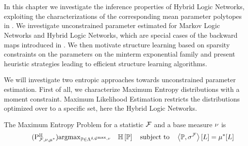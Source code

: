 \chapter{\chatextnetworkReasoning}\label{cha:networkReasoning}

In this chapter we investigate the inference properties of Hybrid Logic Networks, exploiting the characterizations of the corresponding mean parameter polytopes in .
We investigate unconstrained parameter estimated for Markov Logic Networks and Hybrid Logic Networks, which are special cases of the backward maps introduced in .
We then motivate structure learning based on sparsity constraints on the parameters on the minterm exponential family and present heuristic strategies leading to efficient structure learning algorithms.



 \label{sec:parameterEstimation} %

We will investigate two entropic approaches towards unconstrained parameter estimation.
First of all, we characterize Maximum Entropy distributions with a moment constraint.
Maximum Likelihood Estimation restricts the distributions optimized over to a specific set, here the Hybrid Logic Networks.


The Maximum Entropy Problem for a statistic $\mathcal{F}$ and a base measure $\nu$ is %
\begin{align}
    \tag{$\probtagtypeinst{\entropysymbol}{\mlnstat,\basemeasure,\genmean}$}\label{prob:maxEntropyHLN}
    \argmax_{\probtensor\in\bmrealprobof{\basemeasure}} \quad \sentropyof{\probtensor}
    \quad \text{subject to} \quad
    \contractionof{\probtensor,\sencmlnstat}{\selvariable}
    =  \genmeanwith
\end{align}

